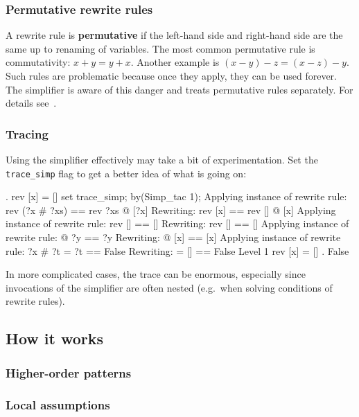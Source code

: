 \subsubsection{Permutative rewrite rules}

A rewrite rule is {\bf permutative} if the left-hand side and right-hand side
are the same up to renaming of variables.  The most common permutative rule
is commutativity: $x+y = y+x$.  Another example is $(x-y)-z = (x-z)-y$.  Such
rules are problematic because once they apply, they can be used forever.
The simplifier is aware of this danger and treats permutative rules
separately. For details see~\cite{Isa-Ref-Man}.

\subsubsection{Tracing}

Using the simplifier effectively may take a bit of experimentation.  Set the
\verb$trace_simp$ flag to get a better idea of what is going on:
\begin{ttbox}\makeatother
{. rev [x] = []}
\ttbreak
set trace_simp;
by(Simp_tac 1);
\ttbreak\makeatother
{\out Applying instance of rewrite rule:}
{\out rev (?x # ?xs) == rev ?xs @ [?x]}
{\out Rewriting:}
{\out rev [x] == rev [] @ [x]}
\ttbreak
{\out Applying instance of rewrite rule:}
{\out rev [] == []}
{\out Rewriting:}
{\out rev [] == []}
\ttbreak\makeatother
{\out Applying instance of rewrite rule:}
{\out [] @ ?y == ?y}
{\out Rewriting:}
{\out [] @ [x] == [x]}
\ttbreak
{\out Applying instance of rewrite rule:}
{\out ?x # ?t = ?t == False}
{\out Rewriting:}
{\out [x] = [] == False}
\ttbreak
{\out Level 1}
{\out rev [x] = []}
{. False}
\end{ttbox}
In more complicated cases, the trace can be enormous, especially since
invocations of the simplifier are often nested (e.g.\ when solving conditions
of rewrite rules).

\subsection{How it works}
\label{sec:SimpHow}

\subsubsection{Higher-order patterns}

\subsubsection{Local assumptions}


